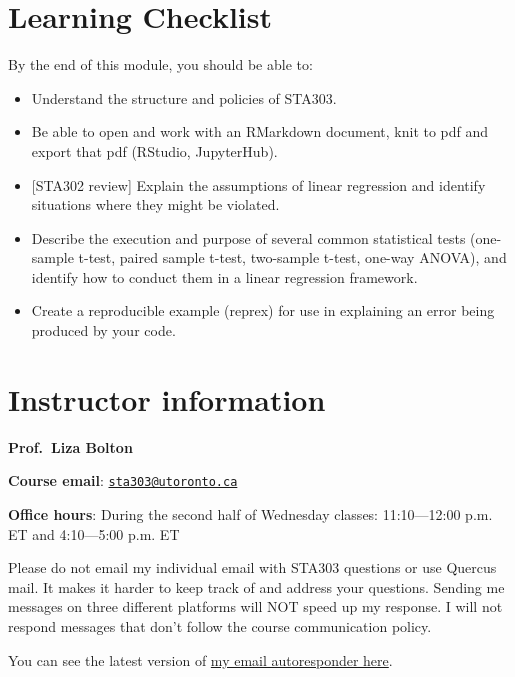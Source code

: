 \documentclass[
  openany]{book}
\providecommand{\tightlist}{%
  \setlength{\itemsep}{0pt}\setlength{\parskip}{0pt}}
\begin{document}
\hypertarget{learning-checklist}{%
\section{Learning Checklist}\label{learning-checklist}}

By the end of this module, you should be able to:

\begin{itemize}
\tightlist
\item
  Understand the structure and policies of STA303.\\
\item
  Be able to open and work with an RMarkdown document, knit to pdf and export that pdf (RStudio, JupyterHub).
\item
  {[}STA302 review{]} Explain the assumptions of linear regression and identify situations where they might be violated.\\
\item
  Describe the execution and purpose of several common statistical tests (one-sample t-test, paired sample t-test, two-sample t-test, one-way ANOVA), and identify how to conduct them in a linear regression framework.\\
\item
  Create a reproducible example (reprex) for use in explaining an error being produced by your code.
\end{itemize}

\hypertarget{instructor-information}{%
\section{Instructor information}\label{instructor-information}}

\textbf{Prof.~Liza Bolton}

\textbf{Course email}: \href{mailto:sta303@utoronto.ca}{\nolinkurl{sta303@utoronto.ca}}

\textbf{Office hours}: During the second half of Wednesday classes: 11:10---12:00 p.m. ET and 4:10---5:00 p.m. ET

Please do not email my individual email with STA303 questions or use Quercus mail. It makes it harder to keep track of and address your questions. Sending me messages on three different platforms will NOT speed up my response. I will not respond messages that don't follow the course communication policy.

You can see the latest version of \href{https://www.lizabolton.com/autoresponder.html}{my email autoresponder here}.
\end{document}
